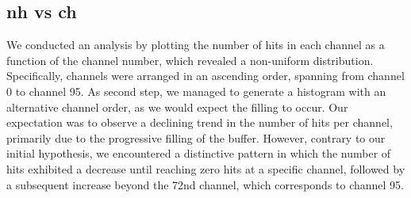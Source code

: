 \subsection{nh vs ch}
We conducted an analysis by plotting the number of hits in each channel as a function of the channel number, which revealed a non-uniform distribution. 
Specifically, channels were arranged in an ascending order, spanning from channel 0 to channel 95.
As second step, we managed to generate a histogram with an alternative channel order, as we would expect the filling to occur.
Our expectation was to observe a declining trend in the number of hits per channel, primarily due to the progressive filling of the buffer. 
However, contrary to our initial hypothesis, we encountered a distinctive pattern in which the number of hits exhibited a decrease until reaching zero hits at a specific channel,
followed by a subsequent increase beyond the 72nd channel, which corresponds to channel 95.

